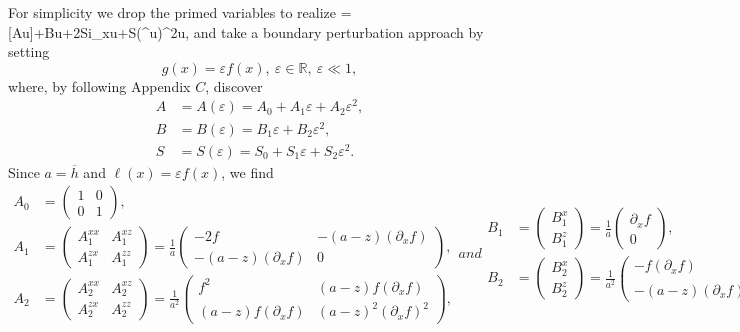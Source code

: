 For simplicity we drop the primed variables to realize
=[A\nabla u]+B\cdot \nabla u+2Si\alpha\partial_{x}u+S(\gamma^u)^2u,
\ees
and take a boundary perturbation approach by setting
\begin{equation}g(x)=\varepsilon f(x),~\varepsilon\in\mathbb R, ~ \varepsilon \ll 1,\end{equation}
where, by following Appendix $C$, discover
\begin{align*}
A&=A(\varepsilon)=A_0+A_1\varepsilon+A_2\varepsilon^2,\\
B&=B(\varepsilon)=B_1\varepsilon+B_2\varepsilon^2,\\
S&=S(\varepsilon)=S_0+S_1\varepsilon + S_2\varepsilon^2.
\end{align*}
Since $a=\overline{h}$ and $\ell(x)=\varepsilon f(x)$, we find
\begin{subequations}
\begin{align}
A_0&=\begin{pmatrix}
    1 & 0\\
    0 & 1
  \end{pmatrix},\\
A_1&=\begin{pmatrix}
    A_1^{xx} & A_1^{xz}\\
    A_1^{zx} & A_1^{zz}
  \end{pmatrix}=\frac{1}{a}
  \begin{pmatrix}
    -2f & -(a-z)(\partial_x f)\\
    -(a-z)(\partial_x f) & 0
  \end{pmatrix},\\
A_2&=\begin{pmatrix}
    A_2^{xx} & A_2^{xz}\\
    A_2^{zx} & A_2^{zz}
  \end{pmatrix}=\frac{1}{a^2}
  \begin{pmatrix}
    f^2 & (a-z)f(\partial_x f)\\
    (a-z)f(\partial_x f) & (a-z)^2(\partial_x f)^2
  \end{pmatrix},
\end{align}
and
\begin{align}
B_1&=\begin{pmatrix} B_1^x \\ B_1^z\end{pmatrix}=
\frac{1}{a}\begin{pmatrix} \partial_x f \\0\end{pmatrix},\\
B_2&=\begin{pmatrix} B_2^x \\ B_2^z\end{pmatrix}=
\frac{1}{a^2}\begin{pmatrix} -f(\partial_x f) \\-(a-z)(\partial_x f)^2\end{pmatrix},
\end{align}
and
\begin{align}
S_0&=1,\quad S_1=-\frac{2}{a}f,\quad S_2=\frac{1}{a^2}f^2.
\end{align}
\end{subequations}
